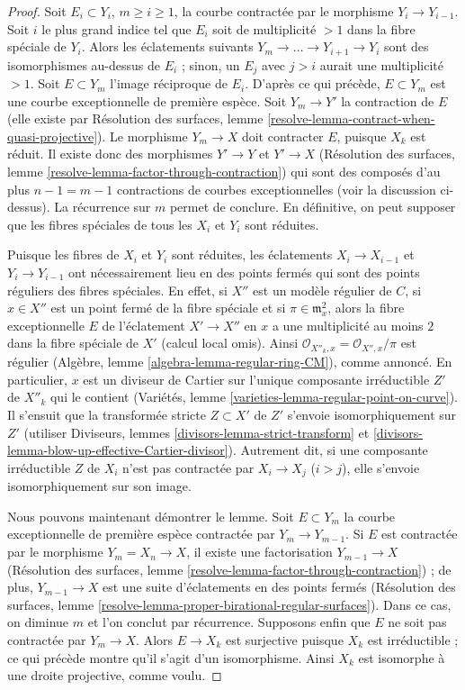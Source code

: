 \begin{proof}
\medskip\noindent
Soit $E_i \subset Y_i$, $m \geq i \geq 1$, la courbe contractée par le
morphisme $Y_i \to Y_{i-1}$. Soit $i$ le plus grand indice tel que $E_i$
soit de multiplicité $>1$ dans la fibre spéciale de $Y_i$. Alors les
éclatements suivants $Y_m \to \ldots \to Y_{i+1} \to Y_i$ sont des
isomorphismes au-dessus de $E_i$ ; sinon, un $E_j$ avec $j>i$ aurait une
multiplicité $>1$. Soit $E \subset Y_m$ l'image réciproque de $E_i$.
D'après ce qui précède, $E \subset Y_m$ est une courbe exceptionnelle de
première espèce. Soit $Y_m \to Y'$ la contraction de $E$ (elle existe par
Résolution des surfaces, lemme
\ref{resolve-lemma-contract-when-quasi-projective}). Le morphisme
$Y_m \to X$ doit contracter $E$, puisque $X_k$ est réduit. Il existe donc
des morphismes $Y' \to Y$ et $Y' \to X$ (Résolution des surfaces, lemme
\ref{resolve-lemma-factor-through-contraction}) qui sont des composés d'au
plus $n-1=m-1$ contractions de courbes exceptionnelles (voir la discussion
ci-dessus). La récurrence sur $m$ permet de conclure. En définitive, on peut
supposer que les fibres spéciales de tous les $X_i$ et $Y_i$ sont réduites.

\medskip\noindent
Puisque les fibres de $X_i$ et $Y_i$ sont réduites, les éclatements
$X_i \to X_{i-1}$ et $Y_i \to Y_{i-1}$ ont nécessairement lieu en des
points fermés qui sont des points réguliers des fibres spéciales.
En effet, si $X''$ est un modèle régulier de $C$, si $x \in X''$ est un
point fermé de la fibre spéciale et si $\pi \in \mathfrak m_x^2$, alors la
fibre exceptionnelle $E$ de l'éclatement $X' \to X''$ en $x$ a une
multiplicité au moins $2$ dans la fibre spéciale de $X'$ (calcul local
omis). Ainsi
$\mathcal{O}_{X''_k,x}=\mathcal{O}_{X'',x}/\pi$ est régulier (Algèbre,
lemme \ref{algebra-lemma-regular-ring-CM}), comme annoncé. En particulier,
$x$ est un diviseur de Cartier sur l'unique composante irréductible
$Z'$ de $X''_k$ qui le contient (Variétés, lemme
\ref{varieties-lemma-regular-point-on-curve}). Il s'ensuit que la
transformée stricte $Z \subset X'$ de $Z'$ s'envoie isomorphiquement sur
$Z'$ (utiliser Diviseurs, lemmes \ref{divisors-lemma-strict-transform} et
\ref{divisors-lemma-blow-up-effective-Cartier-divisor}). Autrement dit, si
une composante irréductible $Z$ de $X_i$ n'est pas contractée par
$X_i \to X_j$ ($i>j$), elle s'envoie isomorphiquement sur son image.

\medskip\noindent
Nous pouvons maintenant démontrer le lemme. Soit $E \subset Y_m$ la courbe
exceptionnelle de première espèce contractée par $Y_m \to Y_{m-1}$.
Si $E$ est contractée par le morphisme $Y_m=X_n \to X$, il existe une
factorisation $Y_{m-1} \to X$ (Résolution des surfaces, lemme
\ref{resolve-lemma-factor-through-contraction}) ; de plus,
$Y_{m-1} \to X$ est une suite d'éclatements en des points fermés
(Résolution des surfaces, lemme
\ref{resolve-lemma-proper-birational-regular-surfaces}). Dans ce cas, on
diminue $m$ et l'on conclut par récurrence. Supposons enfin que $E$ ne soit
pas contractée par $Y_m \to X$. Alors $E \to X_k$ est surjective puisque
$X_k$ est irréductible ; ce qui précède montre qu'il s'agit d'un
isomorphisme. Ainsi $X_k$ est isomorphe à une droite projective, comme
voulu.
\end{proof}
